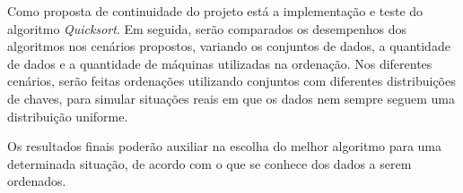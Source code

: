  


Como proposta de continuidade do projeto está a implementação e teste do algoritmo \textit{Quicksort}. 
Em seguida, serão comparados os desempenhos dos algoritmos nos cenários propostos, variando os conjuntos de dados,  a quantidade
de dados e a quantidade de máquinas utilizadas na ordenação. Nos diferentes cenários, serão feitas ordenações utilizando conjuntos com diferentes distribuições de chaves,
para simular situações reais em que os dados nem sempre seguem uma distribuição uniforme.

Os resultados finais poderão auxiliar na escolha do melhor algoritmo para uma determinada situação, de acordo com o que se conhece dos dados a serem ordenados.  